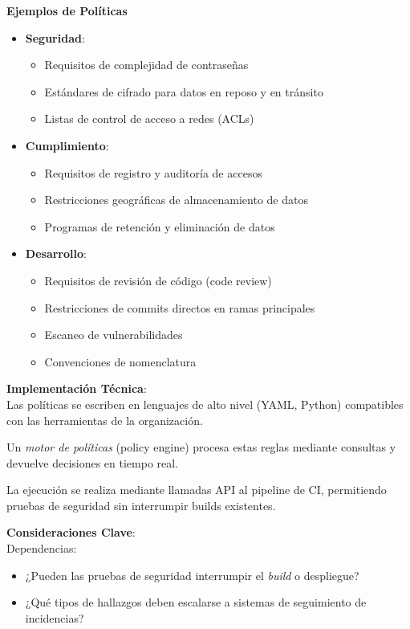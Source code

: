 \documentclass[12pt]{book}
\begin{document}
\textbf{Ejemplos de Políticas}
\begin{itemize}
    \item \textbf{Seguridad}: 
    \begin{itemize}
        \item Requisitos de complejidad de contraseñas
        \item Estándares de cifrado para datos en reposo y en tránsito
        \item Listas de control de acceso a redes (ACLs)
    \end{itemize}
    \item \textbf{Cumplimiento}: 
    \begin{itemize}
        \item Requisitos de registro y auditoría de accesos
        \item Restricciones geográficas de almacenamiento de datos
        \item Programas de retención y eliminación de datos
    \end{itemize}
    \item \textbf{Desarrollo}: 
    \begin{itemize}
        \item Requisitos de revisión de código (code review)
        \item Restricciones de commits directos en ramas principales
        \item Escaneo de vulnerabilidades
        \item Convenciones de nomenclatura
    \end{itemize}
\end{itemize}

\textbf{Implementación Técnica}:\\

Las políticas se escriben en lenguajes de alto nivel (YAML, Python) compatibles con las herramientas de la organización.

Un \textit{motor de políticas} (policy engine) procesa estas reglas mediante consultas y devuelve decisiones en tiempo real.

La ejecución se realiza mediante llamadas API al pipeline de CI, permitiendo pruebas de seguridad sin interrumpir builds existentes.


\textbf{Consideraciones Clave}:\\

Dependencias: 
\begin{itemize}
    \item ¿Pueden las pruebas de seguridad interrumpir el \textit{build} o despliegue?
    \item ¿Qué tipos de hallazgos deben escalarse a sistemas de seguimiento de incidencias?
\end{itemize}
\end{document}
